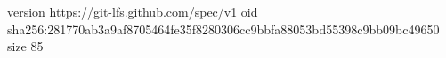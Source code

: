 version https://git-lfs.github.com/spec/v1
oid sha256:281770ab3a9af8705464fe35f8280306cc9bbfa88053bd55398c9bb09bc49650
size 85
